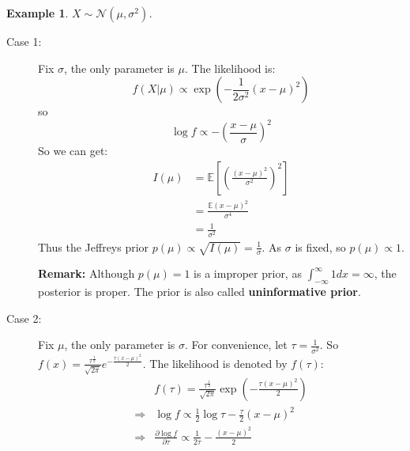 \documentclass[11pt]{article}
\def\MN{{\mathcal N}}
\def\BE{{\mathbb E}}
\newtheorem{example}{Example}[section]
\begin{document}
\begin{example}
$X \sim \MN(\mu, \sigma^2)$.
\end{example}
\begin{description}
\item[Case 1:] Fix $\sigma$, the only parameter is $\mu$. The likelihood is:
$$f(X|\mu) \propto \exp(-\frac{1}{2\sigma^2}(x - \mu)^2)$$
so
$$\log f \propto -(\frac{x-\mu}{\sigma})^2$$So we can get:
\[\begin{split} 
I(\mu) &= \BE\left[ \left( \frac{(x - \mu)^2}{\sigma^2} \right)^2 \right] \\
&= \frac{\BE(x - \mu)^2}{\sigma^4} \\
&= \frac{1}{\sigma^2}
\end{split}\]
Thus the Jeffreys prior $p(\mu) \propto \sqrt{I(\mu)} = \frac{1}{\sigma}$. As $\sigma$ is fixed, so $p(\mu) \propto 1$.

\textbf{Remark:} Although $p(\mu) = 1$ is a improper prior, as $\int_{-\infty}^\infty 1 dx = \infty$, the posterior is proper. 
The prior is also called \textbf{uninformative prior}.

\item[Case 2:] Fix $\mu$, the only parameter is $\sigma$. For convenience, let $\tau = \frac{1}{\sigma^2}$. So $f(x) = \frac{\tau^{\frac{1}{2}}}{\sqrt{2\pi}} e^{-\frac{\tau(x-\mu)^2}{2}}$.
The likelihood is denoted by $f(\tau)$:
\begin{eqnarray*}
&f(\tau) = \frac{\tau^{\frac{1}{2}}}{\sqrt{2\pi}}\exp(-\frac{\tau(x-\mu)^2}{2})\\
\Longrightarrow & \log f \propto \frac{1}{2}\log\tau - \frac{\tau}{2}(x - \mu)^2\\
\Longrightarrow & \frac{\partial\log f}{\partial\tau} \propto \frac{1}{2\tau} - \frac{(x-\mu)^2}{2}\\
\end{eqnarray*}


\end{description}
\end{document}
